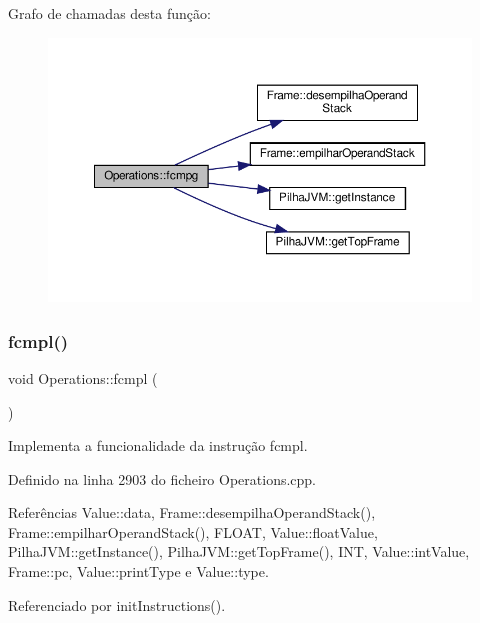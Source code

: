 Grafo de chamadas desta função\+:
\nopagebreak
\begin{figure}[H]
\begin{center}
\leavevmode
\includegraphics[width=350pt]{classOperations_a7825305c331404b97ef209a6e6d988ab_cgraph}
\end{center}
\end{figure}
\mbox{\label{classOperations_aa4a8e2be93a5cc69e40f483958014e39}} 
\subsubsection{\texorpdfstring{fcmpl()}{fcmpl()}}
{\footnotesize\ttfamily void Operations\+::fcmpl (\begin{DoxyParamCaption}{ }\end{DoxyParamCaption})\hspace{0.3cm}{\ttfamily [private]}}



Implementa a funcionalidade da instrução fcmpl. 



Definido na linha 2903 do ficheiro Operations.\+cpp.



Referências Value\+::data, Frame\+::desempilha\+Operand\+Stack(), Frame\+::empilhar\+Operand\+Stack(), F\+L\+O\+AT, Value\+::float\+Value, Pilha\+J\+V\+M\+::get\+Instance(), Pilha\+J\+V\+M\+::get\+Top\+Frame(), I\+NT, Value\+::int\+Value, Frame\+::pc, Value\+::print\+Type e Value\+::type.



Referenciado por init\+Instructions().

